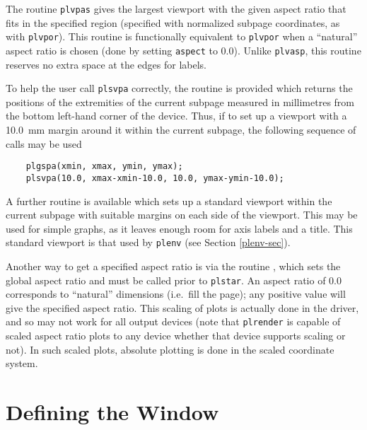 The routine {\tt plvpas} gives the largest viewport with the given aspect
ratio that fits in the specified region (specified with normalized subpage
coordinates, as with {\tt plvpor}).  This routine is functionally
equivalent to {\tt plvpor} when a ``natural'' aspect ratio is chosen (done
by setting {\tt aspect} to 0.0).  Unlike {\tt plvasp}, this routine
reserves no extra space at the edges for labels. 

To help the user call {\tt plsvpa} correctly, the routine 
is provided which returns the positions of the extremities of the
current subpage measured in millimetres from the bottom left-hand corner
of the device. Thus, if to set up a viewport with a 10.0~mm margin
around it within the current subpage, the following sequence of calls
may be used
\begin{verbatim}
    plgspa(xmin, xmax, ymin, ymax);
    plsvpa(10.0, xmax-xmin-10.0, 10.0, ymax-ymin-10.0);
\end{verbatim}

A further routine  is available which sets up a standard
viewport within the current subpage with suitable margins on each side
of the viewport. This may be used for simple graphs, as it leaves enough
room for axis labels and a title. This standard viewport is that used by
{\tt plenv} (see Section \ref{plenv-sec}).

Another way to get a specified aspect ratio is via the routine
, which sets the global aspect ratio and must be called prior
to {\tt plstar}.  An aspect ratio of 0.0 corresponds to ``natural''
dimensions (i.e.~fill the page); any positive value will give the specified
aspect ratio.  This scaling of plots is actually done in the driver, and so
may not work for all output devices (note that {\tt plrender} is capable of
scaled aspect ratio plots to any device whether that device supports
scaling or not).  In such scaled plots, absolute plotting is done in the
scaled coordinate system. 


\section {Defining the Window} \label{window}


